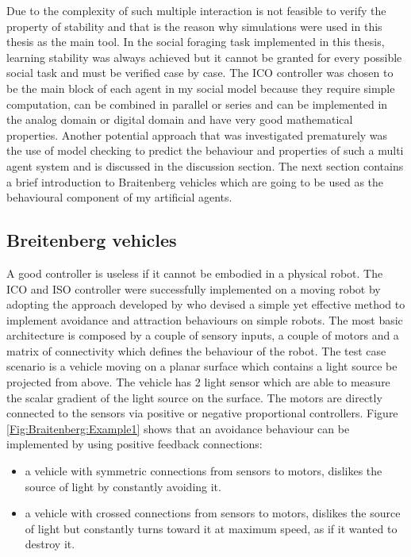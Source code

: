 Due to the complexity of such multiple interaction is not feasible to verify the 
property of stability and that is the reason why simulations were used in this 
thesis as the main tool.
In the social foraging task implemented in this thesis, learning stability was 
always achieved but it cannot be granted for every possible social task and 
must be verified case by case.
The ICO controller \citep{Porr2006ICO} was chosen to be the main block of each agent
 in my social model because they require simple computation, can be combined in parallel or series and
can be implemented in the analog domain or digital domain and have very good mathematical properties.
Another potential approach that was investigated prematurely was the use of 
model checking to predict the behaviour and properties of such a multi agent system and 
is discussed in the discussion section.
The next section contains a brief introduction to Braitenberg vehicles which 
are going to be used as the behavioural component of my artificial agents.

\subsection{Breitenberg vehicles \label{Intro:Braitenberg}}

A good controller is useless if it cannot be embodied in a physical robot.
The ICO and ISO controller were successfully implemented on a moving robot by
 adopting the approach developed by \citet{Braitenberg1986} who devised a simple
 yet effective method to implement avoidance and attraction behaviours on 
simple robots.
The most basic architecture is composed by a couple of sensory inputs, a couple of motors
and a matrix of connectivity which defines the behaviour of the robot.
The test case scenario is a vehicle moving on a planar surface which contains a light source
 be projected from above.
The vehicle has 2 light sensor which are able to measure the scalar gradient of 
the light source on the surface.
The motors are directly connected to the sensors via positive or negative proportional 
controllers.
Figure \ref{Fig:Braitenberg:Example1} shows that an avoidance behaviour can be implemented
 by using positive feedback connections:

\begin{itemize}
 \item a vehicle with symmetric connections from sensors to motors, dislikes the source 
of light by constantly avoiding it.
 \item a vehicle with crossed connections from sensors to motors, dislikes the source of light
but constantly turns toward it at maximum speed, as if it wanted to destroy it.
\end{itemize}

